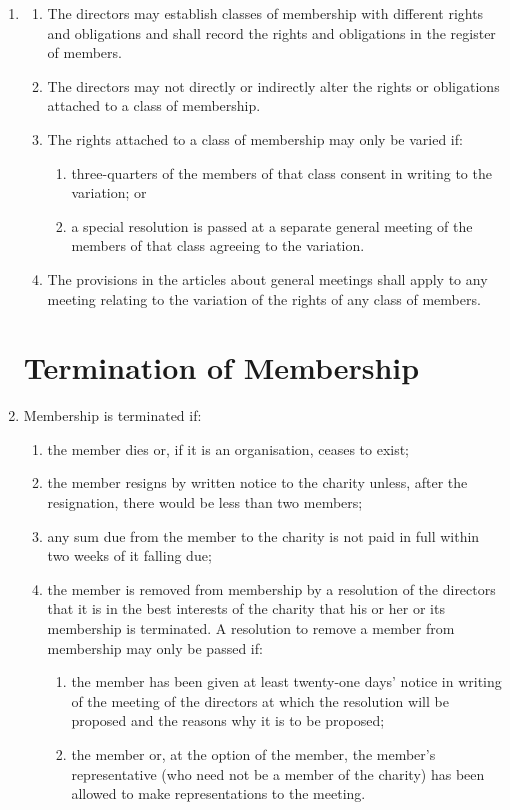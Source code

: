 \begin{enumerate}
\item
  \label{cls:members}
  \begin{enumerate}
  \item
    The directors may establish classes of membership with different
    rights and obligations and shall record the rights and obligations
    in the register of members.
  \item
    The directors may not directly or indirectly alter the rights or
    obligations attached to a class of membership.
  \item
    The rights attached to a class of membership may only be varied if:
    \begin{enumerate}
    \item
      three-quarters of the members of that class consent in writing to
      the variation; or
    \item
      a special resolution is passed at a separate general meeting of the
      members of that class agreeing to the variation.
    \end{enumerate}
  \item
    The provisions in the articles about general meetings shall apply
    to any meeting relating to the variation of the rights of any class
    of members.
  \end{enumerate}

\section{Termination of Membership}

\item
  Membership is terminated if:
  \begin{enumerate}
  \item
    the member dies or, if it is an organisation, ceases to exist;
  \item
    the member resigns by written notice to the charity unless, after
    the resignation, there would be less than two members;
  \item
    any sum due from the member to the charity is not paid in full
    within two weeks of it falling due;
  \item
    the member is removed from membership by a resolution of the
    directors that it is in the best interests of the charity that his
    or her or its membership is terminated. A resolution to remove a
    member from membership may only be passed if:
    \begin{enumerate}
    \item
      the member has been given at least twenty-one days' notice in
      writing of the meeting of the directors at which the resolution
      will be proposed and the reasons why it is to be proposed;
    \item
      the member or, at the option of the member, the member's
      representative (who need not be a member of the charity) has been
      allowed to make representations to the meeting.
    \end{enumerate}
  \end{enumerate}


\end{enumerate}
